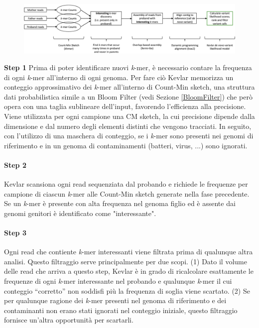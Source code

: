 \documentclass[../main.tex]{subfiles}
\begin{document}
\begin{figure}[ht!]
	\centering
  	\captionsetup{justification=centering}
  	\includegraphics[scale=.27]{images/kevlar_pipeline.png}
  	\caption{}
  	\label{fig:kevlar_pipeline}
\end{figure}

\noindent 
\textbf{Step 1} Prima di poter identificare nuovi \textit{k}-mer, è necessario contare la frequenza di ogni \textit{k}-mer all'interno di ogni genoma. Per fare ciò Kevlar memorizza un conteggio approssimativo dei \textit{k}-mer all'interno di Count-Min sketch, una struttura dati probabilistica simile a un Bloom Filter (vedi Sezione \ref{BloomFilter}) che però opera con una taglia sublineare dell'input, favorendo l'efficienza alla precisione. Viene utilizzata per ogni campione una CM sketch, la cui precisione dipende dalla dimensione e dal numero degli elementi distinti che vengono tracciati. In seguito, con l'utilizzo di una maschera di conteggio, se i \textit{k}-mer sono presenti nei genomi di riferimento e in un genoma di contaminamenti (batteri, virus, ...) sono ignorati.

\paragraph{Step 2} Kevlar scansiona ogni read sequenziata dal probando e richiede le frequenze per campione di ciascun \textit{k}-mer alle Count-Min sketch generate nella fase precedente. Se un \textit{k}-mer è presente con alta frequenza nel genoma figlio ed è assente dai genomi genitori è identificato come "interessante". 

\paragraph{Step 3} Ogni read che contiente \textit{k}-mer interessanti viene filtrata prima di qualunque altra analisi. Questo filtraggio serve principalmente per due scopi. (1) Dato il volume delle read che arriva a questo step, Kevlar è in grado di ricalcolare esattamente le frequenze di ogni \textit{k}-mer interessante nel probando e qualunque \textit{k}-mer il cui conteggio ``corretto'' non soddisfi più la frequenza di soglia viene scartato. (2) Se per qualunque ragione dei \textit{k}-mer presenti nel genoma di riferimento e dei contaminanti non erano stati ignorati nel conteggio iniziale, questo filtraggio fornisce un'altra opportunità per scartarli. 
\end{document}
